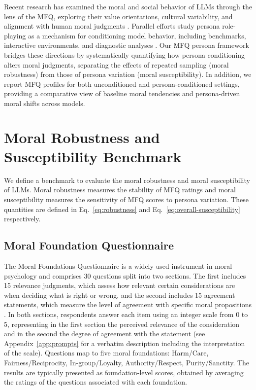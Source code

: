 \documentclass{article}
\begin{document}
Recent research has examined the moral and social behavior of LLMs through the lens of the MFQ, exploring their value orientations, cultural variability, and alignment with human moral judgments \citep{abdulhai-etal-2024-moral,nunes2024hypocrites,aksoy2024whose,bajpai2024insights,ji2025moralbenchmoralevaluationllms}. Parallel efforts study persona role-playing as a mechanism for conditioning model behavior, including benchmarks, interactive environments, and diagnostic analyses \citep{tseng2024two,wang2023rolellm,samuel2025personagym,yu2025rpgbench,xu2024character,elboudouri2025rpeval,bai2025concept}. Our MFQ persona framework bridges these directions by systematically quantifying how persona conditioning alters moral judgments, separating the effects of repeated sampling (moral robustness) from those of persona variation (moral susceptibility). In addition, we report MFQ profiles for both unconditioned and persona-conditioned settings, providing a comparative view of baseline moral tendencies and persona-driven moral shifts across models.

\section{Moral Robustness and Susceptibility Benchmark}

We define a benchmark to evaluate the moral robustness and moral susceptibility of LLMs. Moral robustness measures the stability of MFQ ratings and moral susceptibility measures the sensitivity of MFQ scores to persona variation. These quantities are defined in Eq.~\eqref{eq:robustness} and Eq.~\eqref{eq:overall-susceptibility} respectively.

\subsection{Moral Foundation Questionnaire}

The Moral Foundations Questionnaire \citep{moralfoundations2017questionnaires} is a widely used instrument in moral psychology \citep{graham2009liberals,haidt2007when,moralfoundations2017questionnaires} and comprises 30 questions split into two sections. The first includes 15 relevance judgments, which assess how relevant certain considerations are when deciding what is right or wrong, and the second includes 15 agreement statements, which measure the level of agreement with specific moral propositions \citep{graham2011mfq,moralfoundations2017questionnaires}. In both sections, respondents answer each item using an integer scale from 0 to 5, representing in the first section the perceived relevance of the consideration and in the second the degree of agreement with the statement (see Appendix~\ref{app:prompts} for a verbatim description including the interpretation of the scale). Questions map to five moral foundations: Harm/Care, Fairness/Reciprocity, In-group/Loyalty, Authority/Respect, Purity/Sanctity. The results are typically presented as foundation-level scores, obtained by averaging the ratings of the questions associated with each foundation.
\end{document}
